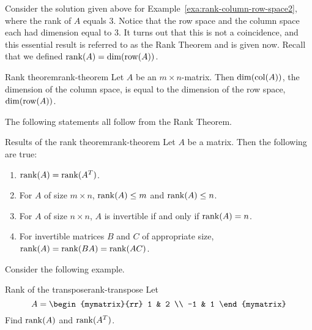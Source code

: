 Consider the solution given above for
Example~\ref{exa:rank-column-row-space2}, where the rank of $A$ equals
$3$. Notice that the row space and the column space each had dimension
equal to $3$. It turns out that this is not a coincidence, and this
essential result is referred to as the Rank Theorem and is given
now. Recall that we defined $\rank(A) = \dim(\row(A))$.

\begin{theorem}{Rank theorem}{rank-theorem}
  Let $A$ be an $m \times n$-matrix. Then $\dim(\col(A))$, the
  dimension of the column space, is equal to the dimension of the row
  space, $\dim(\row(A))$.
\end{theorem}

The following statements all follow from the Rank Theorem.

\begin{corollary}{Results of the rank theorem}{rank-theorem}
  Let $A$ be a matrix. Then the following are true:
  \begin{enumerate}
  \item $\rank(A) = \rank(A^T)$.
  \item For $A$ of size $m \times n$, $\rank(A) \leq m$ and
    $\rank(A) \leq n$.
  \item For $A$ of size $n \times n$, $A$ is invertible if and only if
    $\rank(A) = n$.
  \item For invertible matrices $B$ and $C$ of appropriate size,
    $\rank(A) = \rank(BA) = \rank(AC)$.
  \end{enumerate}
\end{corollary}

Consider the following example.

\begin{example}{Rank of the transpose}{rank-transpose}
  Let \begin{equation*}
    A =
    \begin{mymatrix}{rr}
      1 & 2 \\
      -1 & 1
    \end{mymatrix}
  \end{equation*}
  Find $\rank(A)$ and $\rank(A^T)$.
\end{example}


